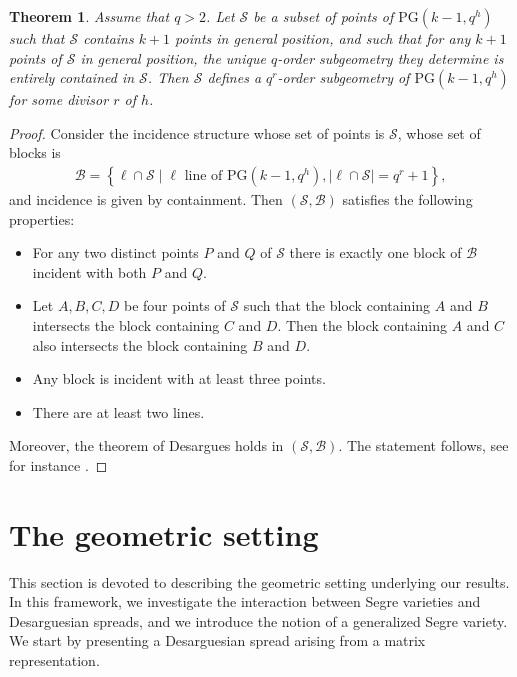 \documentclass[11pt]{article}
\newtheorem{theorem}{Theorem}[section]
\theoremstyle{definition}
\numberwithin{equation}{section}
\def\cB{\mathcal B}
\def\cS{\mathcal S}
\def\PG{\mathrm{PG}}
\begin{document}
\begin{theorem} \label{thm:general}
Assume that $q>2$. Let $\cS$ be a subset of points of $\PG(k-1,q^h)$ such that $\cS$ contains $k+1$ points in general position, and such that for any 
$k+1$ points of $\cS$ in general position, the unique $q$-order 
subgeometry they determine is entirely contained in $\cS$. Then $\cS$ defines a $q^r$-order subgeometry of $\PG(k-1, q^h)$ for
some divisor $r$ of $h$.    
\end{theorem}
\begin{proof}
Consider the incidence structure whose set of points is $\cS$, whose set of blocks is
\begin{align*}
    \cB = \left\{\ell \cap \cS \mid \ell \mbox{ line of } \PG(k-1, q^h), |\ell \cap \cS| = q^r+1\right\},
\end{align*}
and incidence is given by containment. Then $(\cS, \cB)$ satisfies the following properties:
\begin{itemize}
    \item[1)] For any two distinct points $P$ and $Q$  of $\cS$ there is exactly one block of $\cB$ incident with both $P$ and $Q$.
    \item[2)] Let $A, B, C, D$ be four points of $\cS$ such that the block containing $A$ and $B$ intersects the block containing $C$ and $D$. Then the block containing $A$ and $C$ also intersects the block containing $B$ and $D$. 
    \item[3)] Any block is incident with at least three points.
    \item[4)] There are at least two lines. 
\end{itemize}
Moreover, the theorem of Desargues holds in $(\cS, \cB)$. The statement follows, see for instance \cite{Beutelspacher}.
\end{proof}


\section{The geometric setting} \label{sec:geometricsetting}

This section is devoted to describing the geometric setting underlying our results. In this
framework, we investigate the interaction between Segre varieties and
Desarguesian spreads, and we introduce the notion of a generalized Segre
variety. We start by presenting a Desarguesian spread arising from a
matrix representation.
\end{document}

